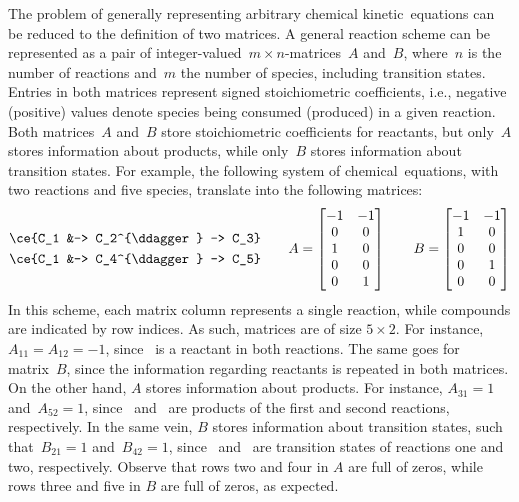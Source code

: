 The problem of generally representing arbitrary chemical kinetic~equations can be reduced to the definition of two matrices.
A general reaction scheme can be represented as a pair of integer-valued~$m \times n$-matrices~$A$ and~$B$,
where~$n$ is the number of reactions and~$m$ the number of species,
including transition states.
Entries in both matrices represent signed stoichiometric coefficients,
i.e.,
negative (positive) values denote species being consumed (produced) in a given reaction.
Both matrices~$A$ and~$B$ store stoichiometric coefficients for reactants,
but only~$A$ stores information about products,
while only~$B$ stores information about transition states.
For example,
the following system of chemical~equations,
with two reactions and five species,
translate into the following matrices:
%
\begin{equation}
	\begin{split}
		\ce{C_1 &-> C_2^{\ddagger} -> C_3} \\
		\ce{C_1 &-> C_4^{\ddagger} -> C_5} \\
	\end{split}
	\qquad
	A = \begin{bmatrix}
		-1 & -1 \\
		0  & 0  \\
		1  & 0  \\
		0  & 0  \\
		0  & 1
	\end{bmatrix}
	\qquad
	B = \begin{bmatrix}
		-1 & -1 \\
		1  & 0  \\
		0  & 0  \\
		0  & 1  \\
		0  & 0
	\end{bmatrix}
\end{equation}
%
In this scheme,
each matrix column represents a single reaction,
while compounds are indicated by row indices.
As such,
matrices are of size $5 \times 2$.
For instance,
$A_{11} = A_{12} = -1$,
since~ is a reactant in both reactions.
The same goes for matrix~$B$,
since the information regarding reactants is repeated in both matrices.
On the other hand,
$A$ stores information about products.
For instance,
$A_{31} = 1$ and~$A_{52} = 1$,
since~ and~ are products of the first and second reactions,
respectively.
In the same vein,
$B$ stores information about transition states,
such that~$B_{21} = 1$ and~$B_{42} = 1$,
since~ and~ are transition states of reactions one and two,
respectively.
Observe that rows two and four in $A$ are full of zeros,
while rows three and five in $B$ are full of zeros,
as expected.

